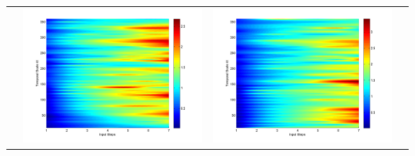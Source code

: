 \documentclass[11pt]{article}
\begin{document}
\begin{table}[H]
{\begin{tabular}{c  c   c   c  }
&\begin{minipage}{.3\textwidth}\includegraphics[width=\linewidth]{resultgraph/05454500pep.png}\end{minipage}
&\begin{minipage}{.3\textwidth}\includegraphics[width=\linewidth]{resultgraph/05454500pepq.png}\end{minipage}
\\

\end{tabular}}
\end{table}
\end{document}
